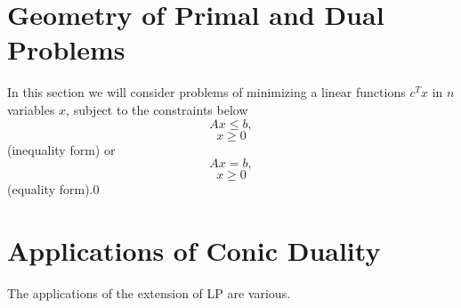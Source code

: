 \documentclass[12pt]{article}
\begin{document}
    \section{Geometry of Primal and Dual Problems}
    In this section we will consider problems of minimizing a linear functions $c^Tx$ in $n$ variables $x$, subject to the constraints below
    $$Ax \leq b,$$ $$x \geq 0$$
    (inequality form) or
    $$Ax = b, $$ $$ x \geq 0$$
    (equality form).0
    \section{Applications of Conic Duality }
    \par The applications of the extension of LP are various. 
\end{document}
